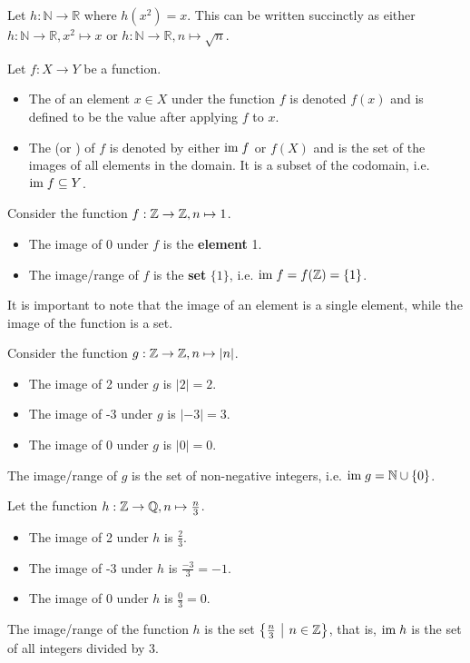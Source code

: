 \begin{example}
    Let $h: \mathbb{N} \to \mathbb{R}$ where $h(x^2) = x$. This can be written succinctly as either $h: \mathbb{N} \to \mathbb{R}, x^2 \mapsto x$ or $h: \mathbb{N} \to \mathbb{R}, n \mapsto \sqrt n$.
\end{example}

\begin{definition}
    Let $f: X \to Y$ be a function.
    \begin{itemize}
        \item The  of an element $x \in X$ under the function $f$ is denoted $f(x)$ and is defined to be the value after applying $f$ to $x$.
        \item The  (or ) of $f$ is denoted by either $\mathrm{im}\; f$ or $f(X)$ and is the set of the images of all elements in the domain. It is a subset of the codomain, i.e. $\mathrm{im}\; f \subseteq Y$.
    \end{itemize}
\end{definition}

\begin{example}
    Consider the function $f: \mathbb{Z} \to \mathbb{Z}, n \mapsto 1$.
    \begin{itemize}
        \item The image of 0 under $f$ is the \textbf{element} 1.
        \item The image/range of $f$ is the \textbf{set} $\{1\}$, i.e. $\mathrm{im}\; f = f(\mathbb{Z}) = \{1\}$.
    \end{itemize}
    It is important to note that the image of an element is a single element, while the image of the function is a set.
\end{example}

\begin{example}
    Consider the function $g: \mathbb{Z} \to \mathbb{Z}, n \mapsto |n|$.
    \begin{itemize}
        \item The image of 2 under $g$ is $|2| = 2$.
        \item The image of -3 under $g$ is $|-3| = 3$.
        \item The image of 0 under $g$ is $|0| = 0$.
    \end{itemize}
    The image/range of $g$ is the set of non-negative integers, i.e. $\mathrm{im}\; g = \mathbb{N} \cup \{0\}$.
\end{example}

\begin{example}
    Let the function $h: \mathbb{Z} \to \mathbb{Q}, n\mapsto\frac n3$.
    \begin{itemize}
        \item The image of 2 under $h$ is $\frac23$.
        \item The image of -3 under $h$ is $\frac{-3}3 = -1$.
        \item The image of 0 under $h$ is $\frac03 = 0$.
    \end{itemize}
    The image/range of the function $h$ is the set $\left\{\frac n3 \vert n \in \Z\right\}$, that is, $\mathrm{im}\; h$ is the set of all integers divided by 3.
\end{example}

